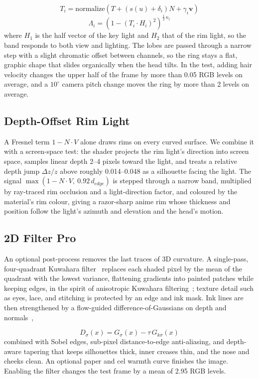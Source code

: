 \documentclass[conference]{IEEEtran}
\begin{document}
\begin{equation}
T_i = \mathrm{normalize}(T + (s(u) + \delta_i) N + \gamma_i \mathbf{v})
\label{eq:tshift}
\end{equation}
\begin{equation}
\Lambda_i = \left(1 - (T_i \cdot H_i)^2\right)^{\frac{1}{2}\,n_i}
\label{eq:kk}
\end{equation}
where $H_1$ is the half vector of the key light and $H_2$ that of the rim light, so the band responds to both view and lighting. The lobes are passed through a narrow step with a slight chromatic offset between channels, so the ring stays a flat, graphic shape that slides organically when the head tilts. In the test, adding hair velocity changes the upper half of the frame by more than 0.05 RGB levels on average, and a $10^\circ$ camera pitch change moves the ring by more than 2 levels on average.


\subsection{Depth-Offset Rim Light}
A Fresnel term $1 - N\cdot V$ alone draws rims on every curved surface. We combine it with a screen-space test: the shader projects the rim light's direction into screen space, samples linear depth 2--4 pixels toward the light, and treats a relative depth jump $\Delta z / z$ above roughly 0.014--0.048 as a silhouette facing the light. The signal $\max(1 - N\cdot V,\ 0.92\,d_{edge})$ is stepped through a narrow band, multiplied by ray-traced rim occlusion and a light-direction factor, and coloured by the material's rim colour, giving a razor-sharp anime rim whose thickness and position follow the light's azimuth and elevation and the head's motion.


\subsection{2D Filter Pro}
An optional post-process removes the last traces of 3D curvature. A single-pass, four-quadrant Kuwahara filter~\cite{kuwahara} replaces each shaded pixel by the mean of the quadrant with the lowest variance, flattening gradients into painted patches while keeping edges, in the spirit of anisotropic Kuwahara filtering~\cite{kyprianidis}; texture detail such as eyes, lace, and stitching is protected by an edge and ink mask. Ink lines are then strengthened by a flow-guided difference-of-Gaussians on depth and normals~\cite{kang,xdog},

\begin{equation}
D_\sigma(x) = G_\sigma(x) - \tau\,G_{k\sigma}(x)
\label{eq:dog}
\end{equation}
combined with Sobel edges, sub-pixel distance-to-edge anti-aliasing, and depth-aware tapering that keeps silhouettes thick, inner creases thin, and the nose and cheeks clean. An optional paper and cel warmth curve finishes the image. Enabling the filter changes the test frame by a mean of 2.95 RGB levels.
\end{document}

